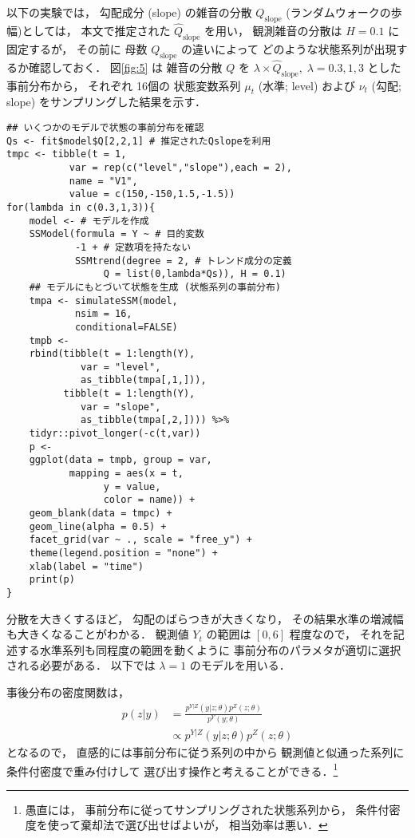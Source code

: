 \documentclass[10pt,oneside,fleqn]{scrartcl}
\begin{document}
以下の実験では，
勾配成分 (slope) の雑音の分散 \(Q_{\mathrm{slope}}\)
(ランダムウォークの歩幅)としては，
本文で推定された \(\hat{Q}_{\mathrm{slope}}\) を用い，
観測雑音の分散は \(H=0.1\) に固定するが，
その前に 母数 \(Q_{\mathrm{slope}}\) の違いによって
どのような状態系列が出現するか確認しておく．
図\ref{fig:5} は
雑音の分散 \(Q\) を
\(\lambda\times \hat{Q}_{\mathrm{slope}},\;\lambda=0.3,1,3\)
とした事前分布から，
それぞれ
16個の
状態変数系列
\(\mu_{t}\) (水準; level)
および
\(\nu_{t}\) (勾配; slope)
をサンプリングした結果を示す．

\begin{figure*}[htbp]
  \centering
\end{figure*}

\begin{verbatim}
## いくつかのモデルで状態の事前分布を確認
Qs <- fit$model$Q[2,2,1] # 推定されたQslopeを利用
tmpc <- tibble(t = 1,
	       var = rep(c("level","slope"),each = 2),
	       name = "V1",
	       value = c(150,-150,1.5,-1.5))
for(lambda in c(0.3,1,3)){
    model <- # モデルを作成
	SSModel(formula = Y ~ # 目的変数
		    -1 + # 定数項を持たない
		    SSMtrend(degree = 2, # トレンド成分の定義
			     Q = list(0,lambda*Qs)), H = 0.1)
    ## モデルにもとづいて状態を生成 (状態系列の事前分布)
    tmpa <- simulateSSM(model,
			nsim = 16,
			conditional=FALSE)
    tmpb <- 
	rbind(tibble(t = 1:length(Y),
		     var = "level",
		     as_tibble(tmpa[,1,])),
	      tibble(t = 1:length(Y),
		     var = "slope",
		     as_tibble(tmpa[,2,]))) %>%
	tidyr::pivot_longer(-c(t,var)) 
    p <- 
	ggplot(data = tmpb, group = var,
	       mapping = aes(x = t,
			     y = value,
			     color = name)) +
	geom_blank(data = tmpc) +
	geom_line(alpha = 0.5) +
	facet_grid(var ~ ., scale = "free_y") +
	theme(legend.position = "none") +
	xlab(label = "time")
    print(p)
}
\end{verbatim}

分散を大きくするほど，
勾配のばらつきが大きくなり，
その結果水準の増減幅も大きくなることがわかる．
観測値 \(Y_{t}\) の範囲は \([0,6]\) 程度なので，
それを記述する水準系列も同程度の範囲を動くように
事前分布のパラメタが適切に選択される必要がある．
以下では
\(\lambda=1\)
のモデルを用いる．

事後分布の密度関数は，
\begin{align}
  p(z|y)
  &=\frac{p^{Y|Z}(y|z;\theta)p^{Z}(z;\theta)}{p^{Y}(y;\theta)}\\
  &\propto p^{Y|Z}(y|z;\theta)p^{Z}(z;\theta)
\end{align}
となるので，
直感的には事前分布に従う系列の中から
観測値と似通った系列に条件付密度で重み付けして
選び出す操作と考えることができる．\footnote{愚直には，
事前分布に従ってサンプリングされた状態系列から，
条件付密度を使って棄却法で選び出せばよいが，
相当効率は悪い．}
\end{document}
